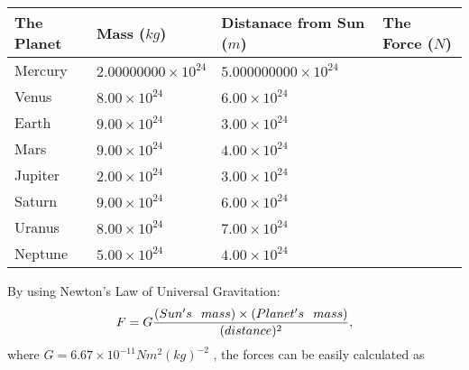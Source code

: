 \documentclass[12pt]{article}
\begin{document}
 
\begin{tabular}{|l|l|l|l|}
\hline
The Planet & Mass ($kg$) & Distanace from Sun ($m$) & The Force ($N$)\\
\hline
Mercury  &
           $ %
2.00000000 \times 10^{24} $   &
             $ %
5.000000000 \times 10^{24} $    &
\\  \hline
Venus    &
           $ %
8.00 \times 10^{24} $    &
             $ %
6.00 \times 10^{24} $    &
\\  \hline
Earth    &
           $ %
9.00 \times 10^{24} $    &
             $ %
3.00 \times 10^{24} $    &
\\   \hline
Mars     &
           $ %
9.00 \times 10^{24} $    &
             $ %
4.00 \times 10^{24} $    &
\\   \hline
Jupiter  &
           $ %
2.00 \times 10^{24} $    &
             $ %
3.00 \times 10^{24} $    &
\\  \hline
Saturn   &
           $ %
9.00 \times 10^{24}$    &
             $ %
6.00 \times 10^{24}$    &
\\  \hline
Uranus   &
           $ %
8.00 \times 10^{24} $    &
             $ %
7.00 \times 10^{24} $    &
\\  \hline
Neptune  &
           $ %
5.00 \times 10^{24} $    &
             $ %
4.00 \times 10^{24} $    &
\\  \hline
 
\end{tabular}
 
 
 
 
\noindent{}
 
 

By using Newton's Law of Universal Gravitation:
\[
F=G \frac{(Sun's \hspace{0.1in} mass) \times (Planet's \hspace{0.1in} mass)} { (distance)^2},
\]
where
$ G= %
6.67 \times 10^{-11}N m^{2}(kg)^{-2}$ , the forces can be easily calculated as
 
\vspace{0.2in}
 
\end{document}
